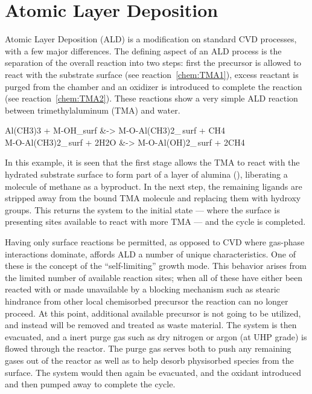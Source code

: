 \section{Atomic Layer Deposition}
	
Atomic Layer Deposition (ALD) is a modification on standard CVD processes, with a few major differences. The defining aspect of an ALD process is the separation of the overall reaction into two steps: first the precursor is allowed to react with the substrate surface (see reaction~\ref{chem:TMA1}), excess reactant is purged from the chamber and an oxidizer is introduced to complete the reaction (see reaction~\ref{chem:TMA2}). These reactions show a very simple ALD reaction between trimethylaluminum (TMA) and water. 

\begin{reactions}
	Al(CH3)3 + M-OH_{surf} &-> M-O-Al(CH3)2_{\,surf} + CH4 \label{chem:TMA1}%
		\\
	M-O-Al(CH3)2_{\,surf} + 2H2O &-> M-O-Al(OH)2_{\,surf} + 2CH4 \label{chem:TMA2}%
\end{reactions}


In this example, it is seen that the first stage allows the TMA to react with the hydrated substrate surface to form part of a layer of alumina (), liberating a molecule of methane as a byproduct. In the next step, the remaining ligands are stripped away from the bound TMA molecule and replacing them with hydroxy groups. This returns the system to the initial state --- where the surface is presenting sites available to react with more TMA --- and the cycle is completed. 

Having only surface reactions be permitted, as opposed to CVD where gas-phase interactions dominate, affords ALD a number of unique characteristics. One of these is the concept of the ``self-limiting'' growth mode. This behavior arises from the limited number of available reaction sites; when all of these have either been reacted with or made unavailable by a blocking mechanism such as stearic hindrance from other local chemisorbed precursor the reaction can no longer proceed. At this point, additional available precursor is not going to be utilized, and instead will be removed and treated as waste material. The system is then evacuated, and a inert purge gas such as dry nitrogen or argon (at UHP grade) is flowed through the reactor. The purge gas serves both to push any remaining gases out of the reactor as well as to help desorb physisorbed species from the surface.  The system would then again be evacuated, and the oxidant introduced and then pumped away to complete the cycle. 

